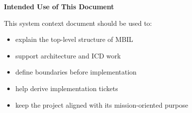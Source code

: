 \documentclass[12pt]{article}
\begin{document}
\textbf{Intended Use of This Document}

This system context document should be used to:
\begin{itemize}[leftmargin=*]
    \item explain the top-level structure of MBIL
    \item support architecture and ICD work
    \item define boundaries before implementation
    \item help derive implementation tickets
    \item keep the project aligned with its mission-oriented purpose
\end{itemize}
\end{document}
